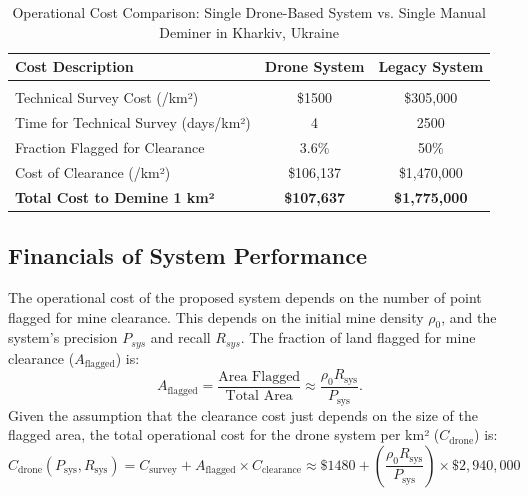 \begin{table}[h!]
\centering
\caption[Operational Cost Comparison]{Operational Cost Comparison: Single Drone-Based System vs. Single Manual Deminer in Kharkiv, Ukraine}
\label{tab:cost_comparison_structured}
\begin{tabular}{lcc} 
\toprule
\textbf{Cost Description} & \textbf{Drone System} & \textbf{Legacy System} \\
\midrule
\multicolumn{3}{l}{}\\
Technical Survey Cost (/km²) & \$1500 & \$305,000 \\ 
Time for Technical Survey (days/km²) &  4 & 2500 \tablefootnote{\url{https://apopo.org/what-we-do/detecting-landmines-and-explosives/how-we-do-it/mine-clearance/}} \\ 
Fraction Flagged for Clearance & 3.6\% & 50\% \\ 
Cost of Clearance (/km²) & \$106,137 & \$1,470,000 \\
 \addlinespace
\textbf{Total Cost to Demine 1 km² } & \textbf{\$107,637} & \textbf{\$1,775,000}  \\
\bottomrule
\end{tabular}
\end{table}

\subsection{Financials of System Performance} \label{subsec:performance_savings}

The operational cost of the proposed system depends on the number of point flagged for mine clearance. This depends on the initial mine density $\rho_0$, and the system's precision $P_{sys}$ and recall $R_{sys}$. The fraction of land flagged for mine clearance ($A_\text{flagged}$) is:
\begin{equation}
A_{\text{flagged}} = \frac{\text{Area Flagged}}{\text{Total Area}} \approx  \frac{\rho_0 R_\text{sys}}{P_\text{sys}}. 
\label{eq:flags_fraction} %
\end{equation}
Given the assumption that the clearance cost just depends on the size of the flagged area, the total operational cost for the drone system per km² ($C_{\text{drone}}$) is:
\begin{equation}
C_{\text{drone}}(P_\text{sys}, R_\text{sys}) = C_{\text{survey}} + A_{\text{flagged}} \times C_{\text{clearance}} 
\approx \$1480 + \left( \frac{\rho_0 R_\text{sys}}{P_\text{sys}} \right) \times \$2,940,000 
\label{eq:drone_op_cost} %
\end{equation}



